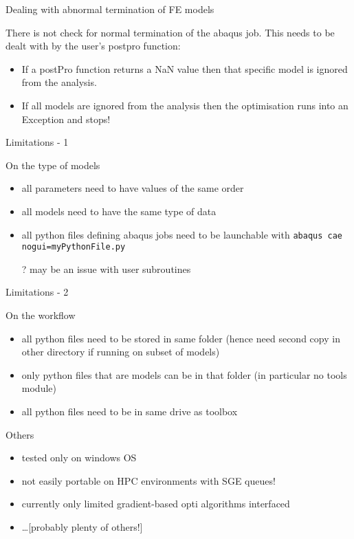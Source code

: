 \begin{frame}{Dealing with abnormal termination of FE models}
\begin{block}{There is not check for normal termination of the abaqus job.}
This needs to be dealt with by the user's postpro function:
\begin{itemize}
\item If a postPro function returns a NaN value then that specific model is ignored from the analysis.
\item If all models are ignored from the analysis then the optimisation runs into an Exception and stops!
\end{itemize}
\end{block}
\end{frame}

\begin{frame}{Limitations - 1}
\begin{block}{On the type of models}
\begin{itemize}
\item all parameters need to have values of the same order
\item all models need to have the same type of data
\item all python files defining abaqus jobs need to be launchable with
  \texttt{abaqus cae nogui=myPythonFile.py}
  
  ? may be an issue with user subroutines
\end{itemize}
\end{block}
\end{frame}

\begin{frame}{Limitations - 2}
\begin{block}{On the workflow}
\begin{itemize}
\item all python files need to be stored in same folder (hence need second copy in other directory if running on subset of models)
\item only python files that are models can be in that folder (in particular no tools module) \item all python files need to be in same drive as toolbox
\end{itemize}
\end{block}
\begin{block}{Others}
\begin{itemize}
\item tested only on windows OS
\item not easily portable on HPC environments with SGE queues!
\item currently only limited gradient-based opti algorithms interfaced
\item \dots [probably plenty of others!]
\end{itemize}
\end{block}
\end{frame}
